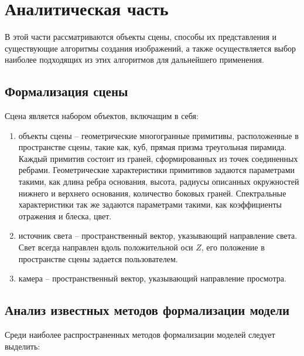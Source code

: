 \chapter{Аналитическая часть}

В этой части рассматриваются объекты сцены, способы их представления и существующие алгоритмы создания изображений, а также осуществляется выбор наиболее подходящих из этих алгоритмов для дальнейшего применения.

\section{Формализация сцены}

Сцена является набором объектов, включащим в себя:

\begin{enumerate}
	\item объекты сцены -- геометрические многогранные примитивы, расположенные в пространстве сцены, такие как, куб, прямая призма треугольная пирамида. Каждый примитив состоит из граней, сформированных из точек соединенных ребрами. Геометрические характеристики примитивов задаются параметрами такими, как длина ребра основания, высота, радиусы описанных окружностей нижнего и верхнего основания, количество боковых граней. Спектральные характеристики так же задаются параметрами такими, как коэффициенты отражения и блеска, цвет.
	\item источник света -- пространственный вектор, указывающий направление света. Свет всегда направлен вдоль положительной оси $Z$, его положение в пространстве сцены задается пользователем.
	\item камера -- пространственный вектор, указывающий направление просмотра.
\end{enumerate}

\section{Анализ известных методов формализации модели}

Среди наиболее распространенных методов формализации моделей следует выделить:

